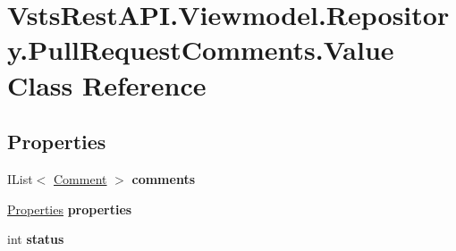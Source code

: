 \hypertarget{class_vsts_rest_a_p_i_1_1_viewmodel_1_1_repository_1_1_pull_request_comments_1_1_value}{}\section{Vsts\+Rest\+A\+P\+I.\+Viewmodel.\+Repository.\+Pull\+Request\+Comments.\+Value Class Reference}
\label{class_vsts_rest_a_p_i_1_1_viewmodel_1_1_repository_1_1_pull_request_comments_1_1_value}
\subsection*{Properties}
\begin{DoxyCompactItemize}
\item 
\mbox{\label{class_vsts_rest_a_p_i_1_1_viewmodel_1_1_repository_1_1_pull_request_comments_1_1_value_ab41492ddbe1d82d0293325968280ad42}} 
I\+List$<$ \mbox{\hyperlink{class_vsts_rest_a_p_i_1_1_viewmodel_1_1_repository_1_1_pull_request_comments_1_1_comment}{Comment}} $>$ {\bfseries comments}
\item 
\mbox{\label{class_vsts_rest_a_p_i_1_1_viewmodel_1_1_repository_1_1_pull_request_comments_1_1_value_ab2642190cabd7911d350d8a9258597cd}} 
\mbox{\hyperlink{class_vsts_rest_a_p_i_1_1_viewmodel_1_1_repository_1_1_pull_request_comments_1_1_properties}{Properties}} {\bfseries properties}
\item 
\mbox{\label{class_vsts_rest_a_p_i_1_1_viewmodel_1_1_repository_1_1_pull_request_comments_1_1_value_a7ee24a6bdfb38994d6d6894724fd249a}} 
int {\bfseries status}
\item 
\mbox{\label{class_vsts_rest_a_p_i_1_1_viewmodel_1_1_repository_1_1_pull_request_comments_1_1_value_a830443609b9a16fdc0407cc20fb01154}} 

\end{DoxyCompactItemize}
